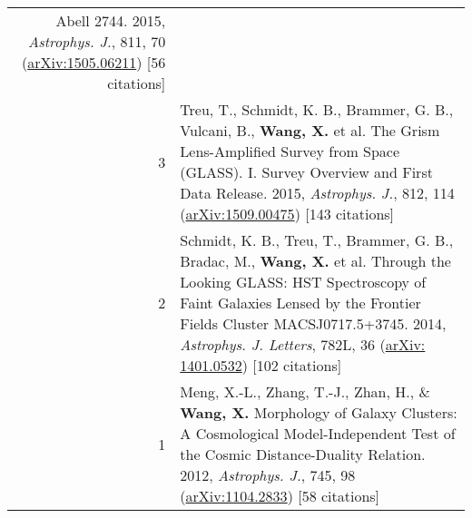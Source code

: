\documentclass[letterpaper,12pt]{article}
\begin{document}
\begin{longtable}{rp{5.8in}}
Abell 2744. 2015, \textit{Astrophys. J.}, 811, 70 (\href{https://arxiv.org/abs/1505.06211}{arXiv:1505.06211}) [56 citations]  \\
3   &   Treu, T., Schmidt, K. B., Brammer, G. B., Vulcani, B., \textbf{Wang, X.} et al. The Grism Lens-Amplified Survey from Space (GLASS). I. Survey 
Overview and First Data Release. 2015, \textit{Astrophys. J.}, 812, 114 (\href{https://arxiv.org/abs/1509.00475}{arXiv:1509.00475}) [143 citations]  \\
2   &   Schmidt, K. B., Treu, T., Brammer, G. B., Bradac, M., \textbf{Wang, X.} et al. Through the Looking GLASS: HST Spectroscopy of Faint Galaxies 
Lensed by the Frontier Fields Cluster MACSJ0717.5+3745. 2014, \textit{Astrophys. J. Letters}, 782L, 36 (\href{http://arxiv.org/abs/1401.0532}{arXiv:
1401.0532}) [102 citations] \\
1   &   Meng, X.-L., Zhang, T.-J., Zhan, H., \& \textbf{Wang, X.} Morphology of Galaxy Clusters: A Cosmological Model-Independent Test of the Cosmic 
Distance-Duality Relation. 2012, \textit{Astrophys. J.}, 745, 98 (\href{http://arxiv.org/abs/1104.2833}{arXiv:1104.2833}) [58 citations]

\end{longtable}
\endgroup
\end{document}
